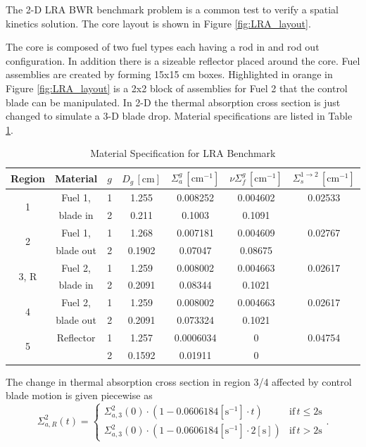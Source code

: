 \documentclass{ansconf}
\numberwithin{equation}{section}
\begin{document}
The 2-D LRA BWR benchmark problem is a common test to verify a spatial kinetics solution. The core layout is shown in Figure \ref{fig:LRA_layout}.

The core is composed of two fuel types each having a rod in and rod out configuration. In addition there is a sizeable reflector placed around the core. Fuel assemblies are created by forming 15x15 cm boxes. Highlighted in orange in Figure \ref{fig:LRA_layout} is a 2x2 block of assemblies for Fuel 2 that the control blade can be manipulated. In 2-D the thermal absorption cross section is just changed to simulate a 3-D blade drop. Material specifications are listed in Table \ref{tab:LRA_mats}.
\begin{table}
\centering
\caption{Material Specification for LRA Benchmark}
\label{tab:LRA_mats}
\begin{tabular}{ccccccc}
\toprule 
Region & Material & $g$ & $D_{g}\,\left[\mathrm{cm}\right]$ & $\Sigma_{a}^{g}\,\left[\mathrm{cm}^{-1}\right]$ & $\nu\Sigma_{f}^{g}\,\left[\mathrm{cm}^{-1}\right]$ & $\Sigma_{s}^{1\rightarrow2}\,\left[\mathrm{cm}^{-1}\right]$\tabularnewline
\midrule
\midrule 
\multirow{2}{*}{1} & Fuel 1, & 1 & 1.255 & 0.008252 & 0.004602 & 0.02533\tabularnewline
\cmidrule{2-7} 
 & blade in & 2 & 0.211 & 0.1003 & 0.1091 & \tabularnewline
\midrule 
\multirow{2}{*}{2} & Fuel 1, & 1 & 1.268 & 0.007181 & 0.004609 & 0.02767\tabularnewline
\cmidrule{2-7} 
 & blade out & 2 & 0.1902 & 0.07047 & 0.08675 & \tabularnewline
\midrule 
\multirow{2}{*}{3, R} & Fuel 2, & 1 & 1.259 & 0.008002 & 0.004663 & 0.02617\tabularnewline
\cmidrule{2-7} 
 & blade in & 2 & 0.2091 & 0.08344 & 0.1021 & \tabularnewline
\midrule 
\multirow{2}{*}{4} & Fuel 2, & 1 & 1.259 & 0.008002 & 0.004663 & 0.02617\tabularnewline
\cmidrule{2-7} 
 & blade out & 2 & 0.2091 & 0.073324 & 0.1021 & \tabularnewline
\midrule 
\multirow{2}{*}{5} & Reflector & 1 & 1.257 & 0.0006034 & 0 & 0.04754\tabularnewline
\cmidrule{2-7} 
 &  & 2 & 0.1592 & 0.01911 & 0 & \tabularnewline
\bottomrule
\end{tabular} 
\end{table}
The change in thermal absorption cross section in region 3/4 affected by control blade motion is given piecewise as
\begin{equation}
    \Sigma_{a,R}^2\left(t\right) = \left\lbrace \begin{array}{cc} \Sigma_{a,3}^2\left(0\right)\cdot\left(1 -0.0606184\left[\mathrm{s}^{-1}\right]\cdot t \right) & \mathrm{if}\,t\le 2\mathrm{s} \\
    \Sigma_{a,3}^2\left(0\right)\cdot\left(1 -0.0606184\left[\mathrm{s}^{-1}\right]\cdot 2\left[\mathrm{s}\right] \right) & \mathrm{if}\,t > 2\mathrm{s} \end{array}\right. .
\end{equation}
\end{document}
